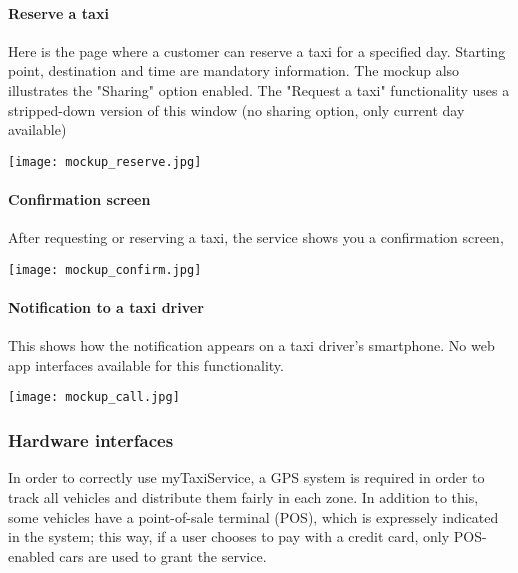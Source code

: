 \pagebreak
\paragraph{Reserve a taxi}
Here is the page where a customer can reserve a taxi for a specified day. Starting point, destination and time are mandatory information. The mockup also illustrates the "Sharing" option enabled. The "Request a taxi" functionality uses a stripped-down version of this window (no sharing option, only current day available)
\begin{center}
\texttt{[image: mockup\_reserve.jpg]}
\end{center}

\pagebreak
\paragraph{Confirmation screen}
After requesting or reserving a taxi, the service shows you a confirmation screen, 
\begin{center}
\texttt{[image: mockup\_confirm.jpg]}
\end{center}

\pagebreak
\paragraph{Notification to a taxi driver}
This shows how the notification appears on a taxi driver's smartphone. No web app interfaces available for this functionality.
\begin{center}
\texttt{[image: mockup\_call.jpg]}
\end{center}

\pagebreak
\subsubsection{Hardware interfaces}
In order to correctly use myTaxiService, a GPS system is required in order to track all vehicles and distribute them fairly in each zone. In addition to this, some vehicles have a point-of-sale terminal (POS), which is expressely indicated in the system; this way, if a user chooses to pay with a credit card, only POS-enabled cars are used to grant the service.

